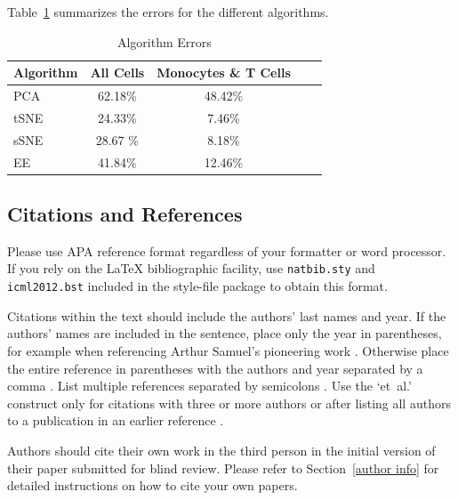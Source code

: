 \documentclass{article}
\begin{document}
Table~\ref{tableErrors} summarizes the errors for the different algorithms.

\begin{table}[tb]
\caption{Algorithm Errors}
\label{tableErrors}
\vskip 0.15in
\begin{center}
\begin{small}
\begin{sc}
\begin{tabular}{lcccr}
\hline
\abovespace\belowspace
Algorithm & All Cells & Monocytes \& T Cells \\
\hline
\abovespace
PCA	& 62.18\% & 48.42\%  \\
tSNE 	& 24.33\%  & 7.46\%\\ 
sSNE	& 28.67 \%  & 8.18\%\\
\belowspace
EE		& 41.84\% &12.46\% \\
\hline
\end{tabular}
\end{sc}
\end{small}
\end{center}
\vskip -0.1in
\end{table}

\subsection{Citations and References} 

Please use APA reference format regardless of your formatter
or word processor. If you rely on the \LaTeX\/ bibliographic 
facility, use {\tt natbib.sty} and {\tt icml2012.bst} 
included in the style-file package to obtain this format.

Citations within the text should include the authors' last names and
year. If the authors' names are included in the sentence, place only
the year in parentheses, for example when referencing Arthur Samuel's
pioneering work . Otherwise place the entire
reference in parentheses with the authors and year separated by a
comma \cite{Bendall:2011bm}. List multiple references separated by
semicolons \cite{Bendall:2011bm, Crammer:2002uy, Bendall:2011bm}. Use the `et~al.'
construct only for citations with three or more authors or after
listing all authors to a publication in an earlier reference \cite{Bendall:2011bm}.

Authors should cite their own work in the third person
in the initial version of their paper submitted for blind review.
Please refer to Section~\ref{author info} for detailed instructions on how to
cite your own papers.
\end{document}

